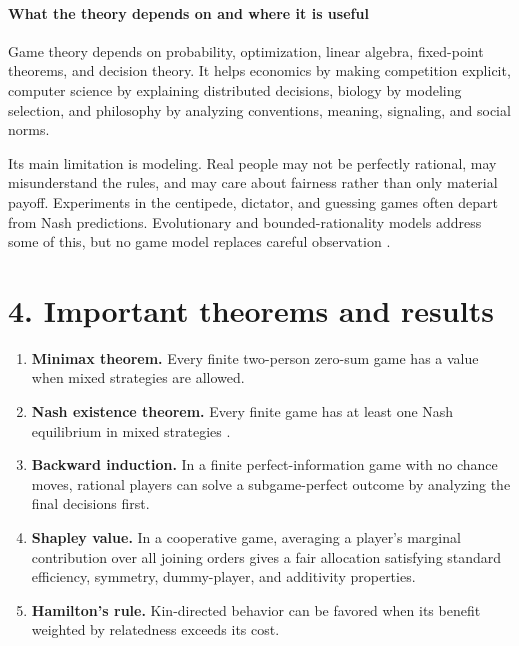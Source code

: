 \paragraph{What the theory depends on and where it is useful}
Game theory depends on probability, optimization, linear algebra, fixed-point theorems, and decision theory. It helps economics by making competition explicit, computer science by explaining distributed decisions, biology by modeling selection, and philosophy by analyzing conventions, meaning, signaling, and social norms.

Its main limitation is modeling. Real people may not be perfectly rational, may misunderstand the rules, and may care about fairness rather than only material payoff. Experiments in the centipede, dictator, and guessing games often depart from Nash predictions. Evolutionary and bounded-rationality models address some of this, but no game model replaces careful observation \cite{game_theory_ref2}.

\section*{4. Important theorems and results}
\begin{enumerate}[leftmargin=*,itemsep=0.35em]
\item \textbf{Minimax theorem.} Every finite two-person zero-sum game has a value when mixed strategies are allowed.

\item \textbf{Nash existence theorem.} Every finite game has at least one Nash equilibrium in mixed strategies \cite{game_theory_ref1}.

\item \textbf{Backward induction.} In a finite perfect-information game with no chance moves, rational players can solve a subgame-perfect outcome by analyzing the final decisions first.

\item \textbf{Shapley value.} In a cooperative game, averaging a player's marginal contribution over all joining orders gives a fair allocation satisfying standard efficiency, symmetry, dummy-player, and additivity properties.

\item \textbf{Hamilton's rule.} Kin-directed behavior can be favored when its benefit weighted by relatedness exceeds its cost.
\end{enumerate}

\theoryapplications
{}
